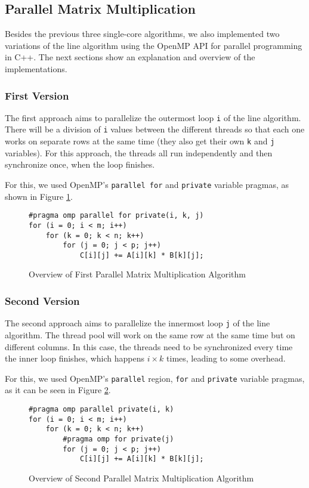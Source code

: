\subsection{Parallel Matrix Multiplication}

Besides the previous three single-core algorithms, we also implemented two variations of the line algorithm using the OpenMP API for parallel programming in C++. The next sections show an explanation and overview of the implementations.

\subsubsection{First Version}

The first approach aims to parallelize the outermost loop \verb#i# of the line algorithm. There will be a division of \verb#i# values between the different threads so that each one works on separate rows at the same time (they also get their own \verb#k# and \verb#j# variables). For this approach, the threads all run independently and then synchronize once, when the loop finishes.

For this, we used OpenMP's \verb#parallel for# and \verb#private# variable pragmas, as shown in Figure \ref{fig:algo:parallel1}.

\begin{figure}[ht!]
\begin{verbatim}
#pragma omp parallel for private(i, k, j)
for (i = 0; i < m; i++)
    for (k = 0; k < n; k++)
        for (j = 0; j < p; j++)
            C[i][j] += A[i][k] * B[k][j];
\end{verbatim}
\caption{Overview of First Parallel Matrix Multiplication Algorithm}
\label{fig:algo:parallel1}
\end{figure}

\subsubsection{Second Version}

The second approach aims to parallelize the innermost loop \verb#j# of the line algorithm. The thread pool will work on the same row at the same time but on different columns. In this case, the threads need to be synchronized every time the inner loop finishes, which happens $i\times k$ times, leading to some overhead.

For this, we used OpenMP's \verb#parallel# region, \verb#for# and \verb#private# variable pragmas, as it can be seen in Figure \ref{fig:algo:parallel2}.

\begin{figure}[ht!]
\begin{verbatim}
#pragma omp parallel private(i, k)
for (i = 0; i < m; i++)
    for (k = 0; k < n; k++)
        #pragma omp for private(j)
        for (j = 0; j < p; j++)
            C[i][j] += A[i][k] * B[k][j];
\end{verbatim}
\caption{Overview of Second Parallel Matrix Multiplication Algorithm}
\label{fig:algo:parallel2}
\end{figure}
